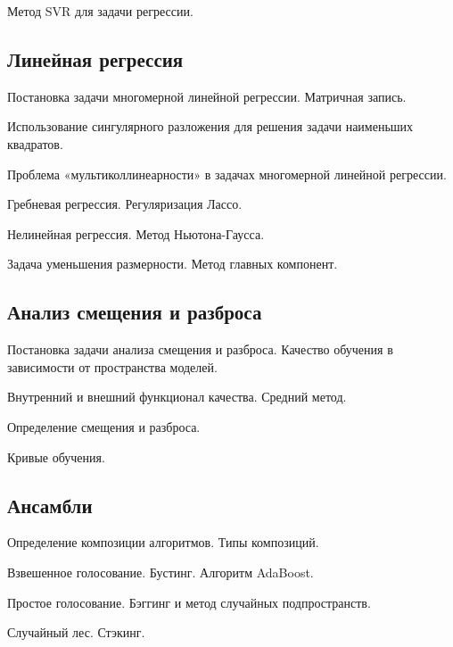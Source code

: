 \documentclass[a4paper,12pt]{article}
\begin{document}
  \myparagraph Метод SVR для задачи регрессии.
      
  \subsection*{Линейная регрессия}
  
  \myparagraph Постановка задачи многомерной линейной регрессии. Матричная запись.
  
  \myparagraph Использование сингулярного разложения для решения задачи наименьших квадратов.

  \myparagraph Проблема «мультиколлинеарности» в задачах многомерной линейной регрессии. 
  
  \myparagraph Гребневая регрессия. Регуляризация Лассо.
  
  \myparagraph Нелинейная регрессия. Метод Ньютона-Гаусса.
  
  \myparagraph Задача уменьшения размерности. Метод главных компонент. 
  
  \subsection*{Анализ смещения и разброса}
  
  \myparagraph Постановка задачи анализа смещения и разброса. Качество обучения в зависимости от пространства моделей.
  
  \myparagraph Внутренний и внешний функционал качества. Средний метод.
  
  \myparagraph Определение смещения и разброса.
  
  \myparagraph Кривые обучения.
  
  \subsection*{Ансамбли}
  
  \myparagraph Определение композиции алгоритмов. Типы композиций.
  
  \myparagraph Взвешенное голосование. Бустинг. Алгоритм AdaBoost. 
  
  \myparagraph Простое голосование. Бэггинг и метод случайных подпространств.
  
  \myparagraph Случайный лес. Стэкинг.  
  
\end{document}
